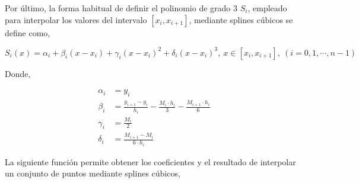 Por último, la forma habitual de definir el polinomio de grado 3 $S_i$, empleado para interpolar los valores del intervalo $[x_i,x_{i+1}]$, mediante splines cúbicos se define como, 

\begin{equation*}
S_i(x)=\alpha_i+\beta_i(x-x_i)+\gamma_i(x-x_i)^2+\delta_i(x-x_i)^3, \ x\in [x_i,x_{i+1}],\ (i=0,1,\cdots,n-1)
\end{equation*}

Donde,

\begin{align*}
\alpha_i &=y_i\\
\beta_i &=\frac{y_{i+1}-y_i}{h_i}-\frac{M_i \cdot h_i}{3}-\frac{M_{i+1} \cdot h_i}{6}\\
\gamma_i &=\frac{M_i}{2}\\
\delta_i &=\frac{M_{i+1}-M_i}{6\cdot h_i}
\end{align*}

La siguiente función permite obtener los coeficientes y el resultado de interpolar un conjunto de puntos mediante splines cúbicos,

